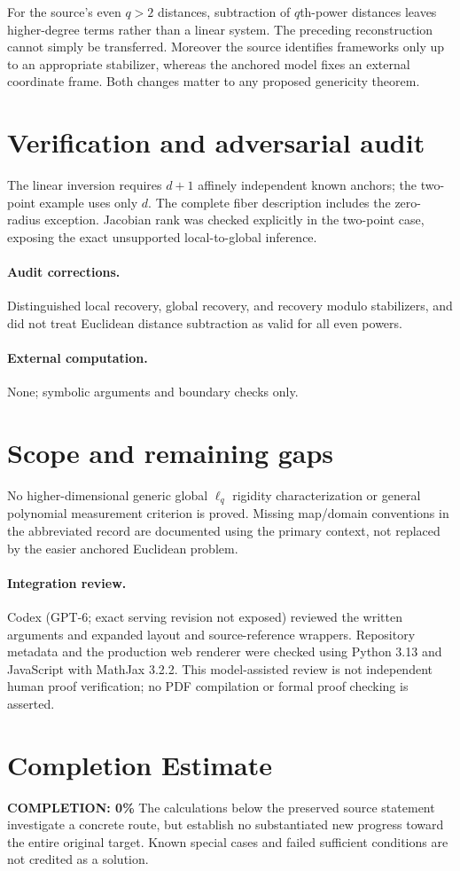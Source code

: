 \documentclass[11pt]{article}
\begin{document}
For the source's even $q>2$ distances, subtraction of $q$th-power distances leaves higher-degree terms rather than a linear system. The preceding reconstruction cannot simply be transferred. Moreover the source identifies frameworks only up to an appropriate stabilizer, whereas the anchored model fixes an external coordinate frame. Both changes matter to any proposed genericity theorem.
\section{Verification and adversarial audit}
The linear inversion requires $d+1$ affinely independent known anchors; the two-point example uses only $d$. The complete fiber description includes the zero-radius exception. Jacobian rank was checked explicitly in the two-point case, exposing the exact unsupported local-to-global inference.
\paragraph{Audit corrections.} Distinguished local recovery, global recovery, and recovery modulo stabilizers, and did not treat Euclidean distance subtraction as valid for all even powers.
\paragraph{External computation.} None; symbolic arguments and boundary checks only.
\section{Scope and remaining gaps}
No higher-dimensional generic global $\ell_q$ rigidity characterization or general polynomial measurement criterion is proved. Missing map/domain conventions in the abbreviated record are documented using the primary context, not replaced by the easier anchored Euclidean problem.
\paragraph{Integration review.} Codex (GPT-6; exact serving revision not exposed) reviewed the written arguments and expanded layout and source-reference wrappers. Repository metadata and the production web renderer were checked using Python 3.13 and JavaScript with MathJax 3.2.2. This model-assisted review is not independent human proof verification; no PDF compilation or formal proof checking is asserted.

\section{Completion Estimate}
\noindent\textbf{COMPLETION: 0\%}
The calculations below the preserved source statement investigate a concrete route,
but establish no substantiated new progress toward the entire original target.
Known special cases and failed sufficient conditions are not credited as a solution.
\end{document}
